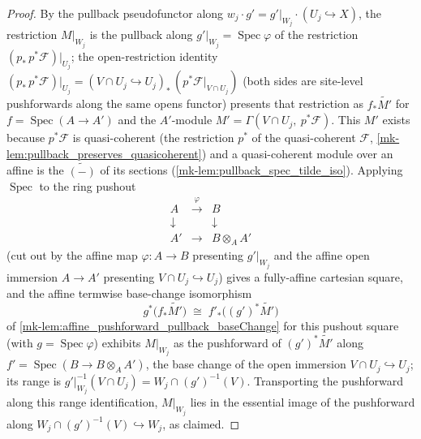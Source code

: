 \begin{proof}
  \leanok{}
  By the pullback pseudofunctor along \(w_j \cdot g' = g'|_{W_j} \cdot (U_j \hookrightarrow X)\),
  the restriction \(M|_{W_j}\) is the pullback along \(g'|_{W_j} = \operatorname{Spec}\varphi\) of
  the restriction \((p_*\,p^*\mathcal{F})|_{U_j}\); the open-restriction identity
  \((p_*\,p^*\mathcal{F})|_{U_j} = (V \cap U_j \hookrightarrow U_j)_*\,(p^*\mathcal{F}|_{V \cap U_j})\)
  (both sides are site-level pushforwards along the same opens functor) presents that restriction
  as \(f_*\widetilde{M'}\) for \(f = \operatorname{Spec}(A \to A')\) and the
  \(A'\)-module \(M' = \Gamma(V \cap U_j,\ p^*\mathcal{F})\). This \(M'\) exists because
  \(p^*\mathcal{F}\) is quasi-coherent (the restriction \(p^*\) of the quasi-coherent
  \(\mathcal{F}\), \ref{mk-lem:pullback_preserves_quasicoherent}) and a quasi-coherent module over an
  affine is the \(\widetilde{(-)}\) of its sections (\ref{mk-lem:pullback_spec_tilde_iso}).
  Applying \(\operatorname{Spec}\) to the ring pushout
  \[
    \begin{array}{ccc}
      A & \xrightarrow{\ \varphi\ } & B\\
      \downarrow & & \downarrow\\
      A' & \longrightarrow & B \otimes_A A'
    \end{array}
  \]
  (cut out by the affine map \(\varphi : A \to B\) presenting \(g'|_{W_j}\) and the affine open
  immersion \(A \to A'\) presenting \(V \cap U_j \hookrightarrow U_j\)) gives a fully-affine
  cartesian square, and the affine termwise base-change isomorphism
  \[
    g^*\bigl(f_*\widetilde{M'}\bigr) \;\cong\; f'_*\bigl((g')^*\widetilde{M'}\bigr)
  \]
  of \ref{mk-lem:affine_pushforward_pullback_baseChange} for this pushout square (with
  \(g = \operatorname{Spec}\varphi\)) exhibits \(M|_{W_j}\) as the pushforward of
  \((g')^*\widetilde{M'}\) along \(f' = \operatorname{Spec}(B \to B \otimes_A A')\), the base
  change of the open immersion \(V \cap U_j \hookrightarrow U_j\); its range is
  \(g'|_{W_j}^{-1}(V \cap U_j) = W_j \cap (g')^{-1}(V)\).  Transporting the pushforward along
  this range identification, \(M|_{W_j}\) lies in the essential image of the pushforward along
  \(W_j \cap (g')^{-1}(V) \hookrightarrow W_j\), as claimed.
\end{proof}

